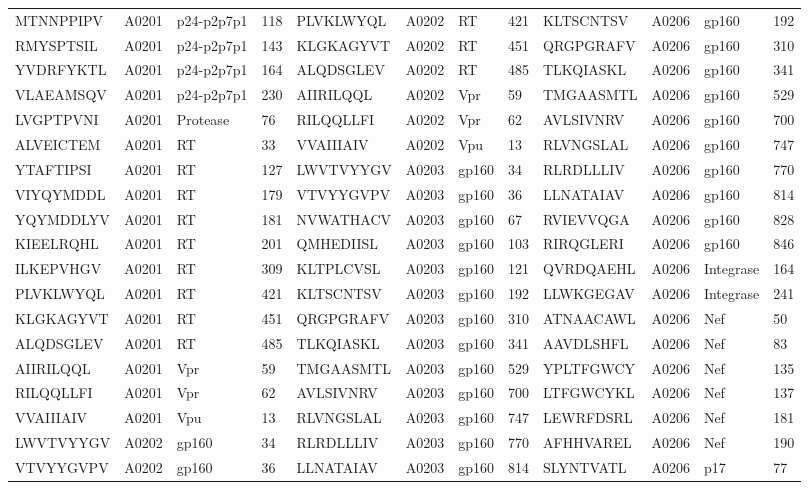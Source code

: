 \begin{table}[htp]
\begin{center}
\begin{sideways}
{\begin{tabulary}{1.5\textwidth}{|l|l|l|l|l|l|l|l|l|l|l|l|}
MTNNPPIPV & A0201 & p24-p2p7p1 & 118 & PLVKLWYQL & A0202 & RT & 421 & KLTSCNTSV & A0206 & gp160 & 192 \\
RMYSPTSIL & A0201 & p24-p2p7p1 & 143 & KLGKAGYVT & A0202 & RT & 451 & QRGPGRAFV & A0206 & gp160 & 310 \\
YVDRFYKTL & A0201 & p24-p2p7p1 & 164 & ALQDSGLEV & A0202 & RT & 485 & TLKQIASKL & A0206 & gp160 & 341 \\
VLAEAMSQV & A0201 & p24-p2p7p1 & 230 & AIIRILQQL & A0202 & Vpr & 59 & TMGAASMTL & A0206 & gp160 & 529 \\
LVGPTPVNI & A0201 & Protease & 76 & RILQQLLFI & A0202 & Vpr & 62 & AVLSIVNRV & A0206 & gp160 & 700 \\
ALVEICTEM & A0201 & RT & 33 & VVAIIIAIV & A0202 & Vpu & 13 & RLVNGSLAL & A0206 & gp160 & 747 \\
YTAFTIPSI & A0201 & RT & 127 & LWVTVYYGV & A0203 & gp160 & 34 & RLRDLLLIV & A0206 & gp160 & 770 \\
VIYQYMDDL & A0201 & RT & 179 & VTVYYGVPV & A0203 & gp160 & 36 & LLNATAIAV & A0206 & gp160 & 814 \\
YQYMDDLYV & A0201 & RT & 181 & NVWATHACV & A0203 & gp160 & 67 & RVIEVVQGA & A0206 & gp160 & 828 \\
KIEELRQHL & A0201 & RT & 201 & QMHEDIISL & A0203 & gp160 & 103 & RIRQGLERI & A0206 & gp160 & 846 \\
ILKEPVHGV & A0201 & RT & 309 & KLTPLCVSL & A0203 & gp160 & 121 & QVRDQAEHL & A0206 & Integrase & 164 \\
PLVKLWYQL & A0201 & RT & 421 & KLTSCNTSV & A0203 & gp160 & 192 & LLWKGEGAV & A0206 & Integrase & 241 \\
KLGKAGYVT & A0201 & RT & 451 & QRGPGRAFV & A0203 & gp160 & 310 & ATNAACAWL & A0206 & Nef & 50 \\
ALQDSGLEV & A0201 & RT & 485 & TLKQIASKL & A0203 & gp160 & 341 & AAVDLSHFL & A0206 & Nef & 83 \\
AIIRILQQL & A0201 & Vpr & 59 & TMGAASMTL & A0203 & gp160 & 529 & YPLTFGWCY & A0206 & Nef & 135 \\
RILQQLLFI & A0201 & Vpr & 62 & AVLSIVNRV & A0203 & gp160 & 700 & LTFGWCYKL & A0206 & Nef & 137 \\
VVAIIIAIV & A0201 & Vpu & 13 & RLVNGSLAL & A0203 & gp160 & 747 & LEWRFDSRL & A0206 & Nef & 181 \\
LWVTVYYGV & A0202 & gp160 & 34 & RLRDLLLIV & A0203 & gp160 & 770 & AFHHVAREL & A0206 & Nef & 190 \\
VTVYYGVPV & A0202 & gp160 & 36 & LLNATAIAV & A0203 & gp160 & 814 & SLYNTVATL & A0206 & p17 & 77 \\

\end{tabulary}}
\end{sideways}
\end{center}
\end{table}
